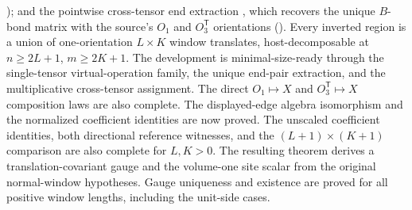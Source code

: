 \documentclass{article}
\begin{document}
); and the
pointwise cross-tensor end extraction
,
which recovers the unique $B$-bond matrix with the source's $O_1$ and
$O_3^{\mathsf T}$ orientations
(). Every
inverted region is a union of one-orientation $L \times K$ window translates,
host-decomposable at $n \geq 2L+1$, $m \geq 2K+1$. The development is
minimal-size-ready through the single-tensor virtual-operation family, the
unique end-pair extraction, and the multiplicative cross-tensor assignment.
The direct $O_1\mapsto X$ and $O_3^{\mathsf T}\mapsto X$ composition laws are
also complete. The displayed-edge algebra isomorphism and the normalized
coefficient identities are now proved. The unscaled coefficient identities, both directional reference witnesses,
and the $(L+1) \times (K+1)$ comparison are also complete for $L,K>0$.
The resulting theorem derives a translation-covariant gauge and the
volume-one site scalar from the original normal-window hypotheses.
Gauge uniqueness and existence are proved for all positive window lengths,
including the unit-side cases.
\end{document}
